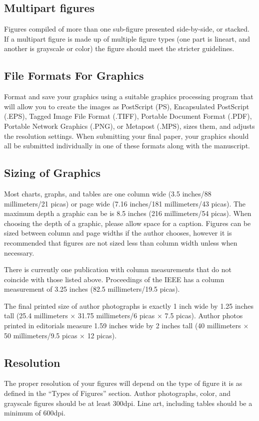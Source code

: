 \documentclass[journal,onecolumn,web]{ieeecolor}
\begin{document}
\subsection{Multipart figures}
Figures compiled of more than one sub-figure presented side-by-side, or 
stacked. If a multipart figure is made up of multiple figure
types (one part is lineart, and another is grayscale or color) the figure 
should meet the stricter guidelines.

\subsection{File Formats For Graphics}\label{formats}
Format and save your graphics using a suitable graphics processing program 
that will allow you to create the images as PostScript (PS), Encapsulated 
PostScript (.EPS), Tagged Image File Format (.TIFF), Portable Document 
Format (.PDF), Portable Network Graphics (.PNG), or Metapost (.MPS), sizes them, and adjusts 
the resolution settings. When 
submitting your final paper, your graphics should all be submitted 
individually in one of these formats along with the manuscript.

\subsection{Sizing of Graphics}
Most charts, graphs, and tables are one column wide (3.5 inches/88 
millimeters/21 picas) or page wide (7.16 inches/181 millimeters/43 
picas). The maximum depth a graphic can be is 8.5 inches (216 millimeters/54
picas). When choosing the depth of a graphic, please allow space for a 
caption. Figures can be sized between column and page widths if the author 
chooses, however it is recommended that figures are not sized less than 
column width unless when necessary. 

There is currently one publication with column measurements that do not 
coincide with those listed above. Proceedings of the IEEE has a column 
measurement of 3.25 inches (82.5 millimeters/19.5 picas). 

The final printed size of author photographs is exactly
1 inch wide by 1.25 inches tall (25.4 millimeters$\,\times\,$31.75 millimeters/6 
picas$\,\times\,$7.5 picas). Author photos printed in editorials measure 1.59 inches 
wide by 2 inches tall (40 millimeters$\,\times\,$50 millimeters/9.5 picas$\,\times\,$12 
picas).

\subsection{Resolution }
The proper resolution of your figures will depend on the type of figure it 
is as defined in the ``Types of Figures'' section. Author photographs, 
color, and grayscale figures should be at least 300dpi. Line art, including 
tables should be a minimum of 600dpi.
\end{document}
